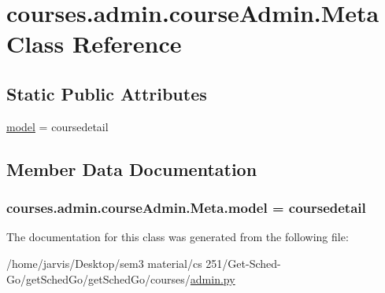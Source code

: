 \hypertarget{classcourses_1_1admin_1_1courseAdmin_1_1Meta}{}\section{courses.\+admin.\+course\+Admin.\+Meta Class Reference}
\label{classcourses_1_1admin_1_1courseAdmin_1_1Meta}
\subsection*{Static Public Attributes}
\begin{DoxyCompactItemize}
\item 
\hyperlink{classcourses_1_1admin_1_1courseAdmin_1_1Meta_a7ca6e0f4f1857011d6f1e9577358fb6d}{model} = coursedetail
\end{DoxyCompactItemize}


\subsection{Member Data Documentation}
\subsubsection[{\texorpdfstring{model}{model}}]{\setlength{\rightskip}{0pt plus 5cm}courses.\+admin.\+course\+Admin.\+Meta.\+model = coursedetail\hspace{0.3cm}{\ttfamily [static]}}\hypertarget{classcourses_1_1admin_1_1courseAdmin_1_1Meta_a7ca6e0f4f1857011d6f1e9577358fb6d}{}\label{classcourses_1_1admin_1_1courseAdmin_1_1Meta_a7ca6e0f4f1857011d6f1e9577358fb6d}


The documentation for this class was generated from the following file\+:\begin{DoxyCompactItemize}
\item 
/home/jarvis/\+Desktop/sem3 material/cs 251/\+Get-\/\+Sched-\/\+Go/get\+Sched\+Go/get\+Sched\+Go/courses/\hyperlink{courses_2admin_8py}{admin.\+py}\end{DoxyCompactItemize}

